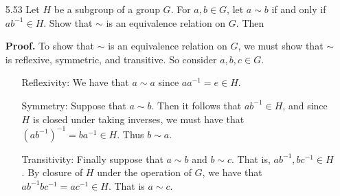 \begin{enumerate}
      \begin{enumerate}
         \item Let $S$ be any subset of a group $G$.
               $$H_S = \{x \in G : xs = sx \text{ for all } s \in S\}.$$
               We want to show that $H_S \le G$. Let $s \in S$. Since
               $es = se = s$, it follows that $e \in H_S$, so that $H_S$ is 
               nonempty. So let $r, t \in H_S$. So we have that $rs = sr$, so 
               that $s = r^{-1}sr$; that is, $sr^{-1} = r^{-1}s$, so
               that $r^{-1} \in H_S$. It remains to show that $rt \in H_S$. I.e.
               we want to show that $(rt)s = s(rt)$; so,
               \begin{align*}
                  (rt)s &= r(ts) \\
                        &= r(st) &[t \in H_S] \\
                        &= (rs)t \\
                        &= (sr)t &[r \in H_S] \\
                        &= s(rt).
               \end{align*}

               Since $e, r^{-1}, rt \in H_S$, it follows by Theorem 5.14 that 
               $H_S$ is a subgroup of $G$. \qed
         \item By (a), it follows that $H_G \le G$. Consider $a, b \in H_G$.
               Since $a \in H_G$ and since $b \in G$, it follows that $ab = ba$
               so that $H_G$ is abelian. \qed
      \end{enumerate}
   \item[5.53] Let $H$ be a subgroup of a group $G$. For $a, b \in G$, let
               $a \sim b$ if and only if $ab^{-1} \in H$. Show that $\sim$ is an
               equivalence relation on $G$. Then

      \textbf{Proof.} To show that $\sim$ is an equivalence relation on $G$, we
      must show that $\sim$ is reflexive, symmetric, and transitive. So consider
      $a, b, c \in G$. 
      \begin{enumerate}
         \item[Reflexivity:]  We have that $a \sim a$ since $aa^{-1} = e \in H$.
         \item[Symmetry:]     Suppose that $a \sim b$. Then it follows that
                              $ab^{-1} \in H$, and since $H$ is closed under
                              taking inverses, we must have that
                              $(ab^{-1})^{-1} = ba^{-1} \in H$. Thus $b \sim a$.
         \item[Transitivity:] Finally suppose that $a \sim b$ and $b \sim c$.
                              That is, $ab^{-1}, bc^{-1} \in H$. By closure of
                              $H$ under the operation of $G$, we have that
                              $ab^{-1}bc^{-1} = ac^{-1}\in H$. That is
                              $a \sim c$.
      \end{enumerate}


\end{enumerate}
